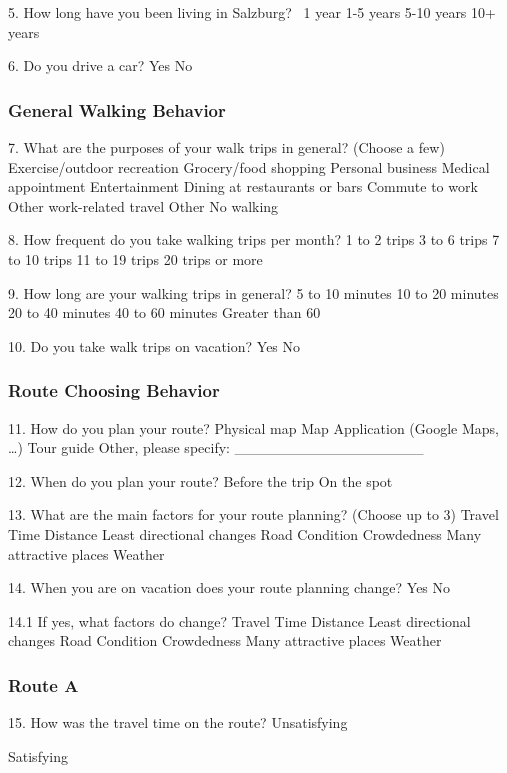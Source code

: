 5. How long have you been living in Salzburg?
 ~1 year
 1-5 years
 5-10 years
10+ years

6. Do you drive a car?
Yes
No


\subsubsection{General Walking Behavior}

7. What are the purposes of your walk trips in general? (Choose a few)
Exercise/outdoor recreation
Grocery/food shopping
Personal business
Medical appointment
Entertainment
Dining at restaurants or bars
Commute to work
Other work-related travel
Other
No walking

8. How frequent do you take walking trips per month?
1 to 2 trips
3 to 6 trips
7 to 10 trips
11 to 19 trips
20 trips or more

9. How long are your walking trips in general?
5 to 10 minutes
10 to 20 minutes
20 to 40 minutes
40 to 60 minutes
Greater than 60

10. Do you take walk trips on vacation?
Yes
No


\subsubsection{Route Choosing Behavior}

11. How do you plan your route?
Physical map
Map Application (Google Maps, …)
Tour guide
Other, please specify: __________________

12. When do you plan your route?
Before the trip
On the spot

13. What are the main factors for your route planning? (Choose up to 3)
Travel Time
Distance
Least directional changes
Road Condition
Crowdedness
Many attractive places
Weather

14. When you are on vacation does your route planning change?
Yes
No

14.1 If yes, what factors do change?
Travel Time
Distance
Least directional changes
Road Condition
Crowdedness
Many attractive places
Weather

\subsubsection{Route A}


15. How was the travel time on the route? 
Unsatisfying



Satisfying

